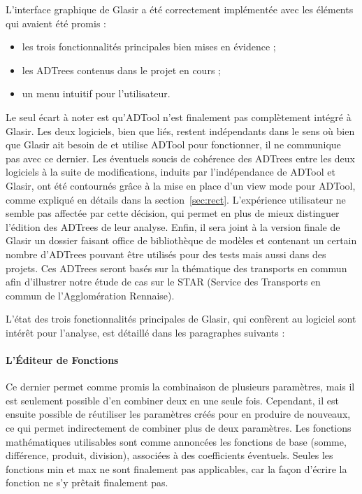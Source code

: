 L'interface graphique de Glasir a été correctement implémentée avec les éléments qui avaient été promis : 
\begin{itemize}
	\item les trois fonctionnalités principales bien mises en évidence ;
	\item les ADTrees contenus dans le projet en cours ;
	\item un menu intuitif pour l'utilisateur.
\end{itemize}
Le seul écart à noter est qu'ADTool n'est finalement pas complètement intégré à Glasir. Les deux logiciels, bien que liés, restent indépendants dans le sens où bien que Glasir ait besoin de et utilise ADTool pour fonctionner, il ne communique pas avec ce dernier. Les éventuels soucis de cohérence des ADTrees entre les deux logiciels à la suite de modifications, induits par l'indépendance de ADTool et Glasir, ont été contournés grâce à la mise en place d'un \og view mode \fg{} pour ADTool, comme expliqué en détails dans la {\sc section}~\ref{sec:rect}. L'expérience utilisateur ne semble pas affectée par cette décision, qui permet en plus de mieux distinguer l'édition des ADTrees de leur analyse. Enfin, il sera joint à la version finale de Glasir un dossier faisant office de bibliothèque de modèles et contenant un certain nombre d'ADTrees pouvant être utilisés pour des tests mais aussi dans des projets. Ces ADTrees seront basés sur la thématique des transports en commun afin d'illustrer notre étude de cas sur le STAR (Service des Transports en commun de l'Agglomération Rennaise).

L'état des trois fonctionnalités principales de Glasir, qui confèrent au logiciel sont intérêt pour l'analyse, est détaillé dans les paragraphes suivants :

\paragraph{L'Éditeur de Fonctions} Ce dernier permet comme promis la combinaison de plusieurs paramètres, mais il est seulement possible d'en combiner deux en une seule fois. Cependant, il est ensuite possible de réutiliser les paramètres créés pour en produire de nouveaux, ce qui permet indirectement de combiner plus de deux paramètres. Les fonctions mathématiques utilisables sont comme annoncées les fonctions de base (somme, différence, produit, division), associées à des coefficients éventuels. Seules les fonctions min et max ne sont finalement pas applicables, car la façon d'écrire la fonction ne s'y prêtait finalement pas.

